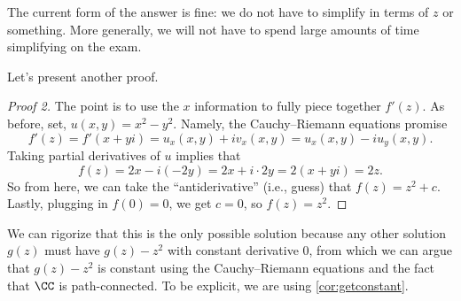 \documentclass[../notes.tex]{subfiles}
\begin{document}
\begin{remark}
	The current form of the answer is fine: we do not have to simplify in terms of $z$ or something. More generally, we will not have to spend large amounts of time simplifying on the exam.
\end{remark}
Let's present another proof.
\begin{proof}[Proof 2]
	The point is to use the $x$ information to fully piece together $f'(z)$. As before, set, $u(x,y)=x^2-y^2$. Namely, the Cauchy--Riemann equations promise
	\[f'(z)=f'(x+yi)=u_x(x,y)+iv_x(x,y)=u_x(x,y)-iu_y(x,y).\]
	Taking partial derivatives of $u$ implies that
	\[f(z)=2x-i(-2y)=2x+i\cdot 2y=2(x+yi)=2z.\]
	So from here, we can take the ``antiderivative'' (i.e., guess) that $f(z)=z^2+c$. Lastly, plugging in $f(0)=0$, we get $c=0$, so $\boxed{f(z)=z^2}$.
\end{proof}
\begin{remark}
	We can rigorize that this is the only possible solution because any other solution $g(z)$ must have $g(z)-z^2$ with constant derivative $0$, from which we can argue that $g(z)-z^2$ is constant using the Cauchy--Riemann equations and the fact that $\CC$ is path-connected. To be explicit, we are using \autoref{cor:getconstant}.
\end{remark}
\end{document}
